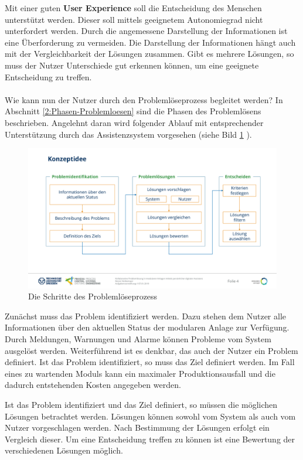 Mit einer guten \textbf{User Experience} soll die Entscheidung des Menschen unterstützt werden. Dieser soll mittels geeignetem Autonomiegrad nicht unterfordert werden. Durch die angemessene Darstellung der Informationen ist eine Überforderung zu vermeiden. Die Darstellung der Informationen hängt auch mit der Vergleichbarkeit der Lösungen zusammen. Gibt es mehrere Lösungen, so muss der Nutzer Unterschiede gut erkennen können, um eine geeignete Entscheidung zu treffen.
\\ \\
Wie kann nun der Nutzer durch den Problemlöseprozess begleitet werden? In Abschnitt \ref{2:Phasen-Problemloesen} sind die Phasen des Problemlösens beschrieben. Angelehnt daran wird folgender Ablauf mit entsprechender Unterstützung durch das Assistenzsystem vorgesehen (siehe Bild \ref{pic:Konzeptidee} ).
\begin{figure}[htbp]
\centering
\includegraphics[scale=0.45]{DA_files/Bilder/Konzept/Konzeptidee.pdf}
\caption{Die Schritte des Problemlöseprozess}
\label{pic:Konzeptidee}
\end{figure}

Zunächst muss das Problem identifiziert werden. Dazu stehen dem Nutzer alle Informationen über den aktuellen Status der modularen Anlage zur Verfügung. Durch Meldungen, Warnungen und Alarme können Probleme vom System ausgelöst werden. Weiterführend ist es denkbar, das auch der Nutzer ein Problem definiert. Ist das Problem identifiziert, so muss das Ziel definiert werden. Im Fall eines zu wartenden Moduls kann ein maximaler Produktionsausfall und die dadurch entstehenden Kosten angegeben werden.

Ist das Problem identifiziert und das Ziel definiert, so müssen die möglichen Lösungen betrachtet werden. Lösungen können sowohl vom System als auch vom Nutzer vorgeschlagen werden. Nach Bestimmung der Lösungen erfolgt ein Vergleich dieser. Um eine Entscheidung treffen zu können ist eine Bewertung der verschiedenen Lösungen möglich.

